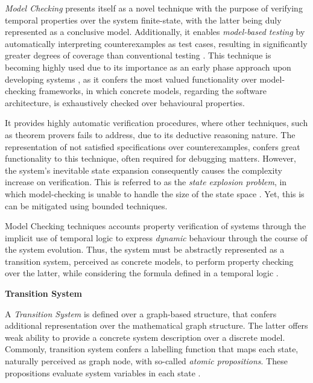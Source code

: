 \textit{Model Checking} presents itself as a novel technique with the purpose of verifying temporal properties over the system finite-state, with the latter being duly represented as a conclusive model. Additionally, it enables \textit{model-based testing} by automatically interpreting counterexamples as test cases, resulting in significantly greater degrees of coverage than conventional testing \cite{fraser2009testing, beyer2017software}. This technique is becoming highly used due to its importance as an early phase approach upon developing systems \cite{lwspecification}, as it confers the most valued functionality over model-checking frameworks, in which concrete models, regarding the software architecture, is exhaustively checked over behavioural properties. 

It provides highly automatic verification procedures, where other techniques, such as theorem provers fails to address, due to its deductive reasoning nature. The representation of not satisfied specifications over counterexamples, confers great functionality to this technique, often required for debugging matters.
However, the system's inevitable state expansion consequently causes the complexity increase on verification. This is referred to as the \textit{state explosion problem}, in which model-checking is unable to handle the size of the state space \cite{clarke2011model, clarke1997model}. Yet, this is can be mitigated using bounded techniques.

Model Checking techniques accounts property verification of systems through the implicit use of temporal logic to express \textit{dynamic} behaviour through the course of the system evolution. Thus, the system must be abstractly represented as a transition system, perceived as concrete models, to perform property checking over the latter, while considering the formula defined in a temporal logic \cite{huth2004logic, vakili2012temporal}. 

\vspace{0.5cm}
\textbf{Transition System}

A \textit{Transition System} is defined over a graph-based structure, that confers additional representation over the mathematical graph structure. The latter offers weak ability to provide a concrete system description over a discrete model. Commonly, transition system confers a labelling function that maps each state, naturally perceived as graph node, with so-called \textit{atomic propositions}. These propositions evaluate system variables in each state \cite{muller1999model, vakili2012temporal}.

